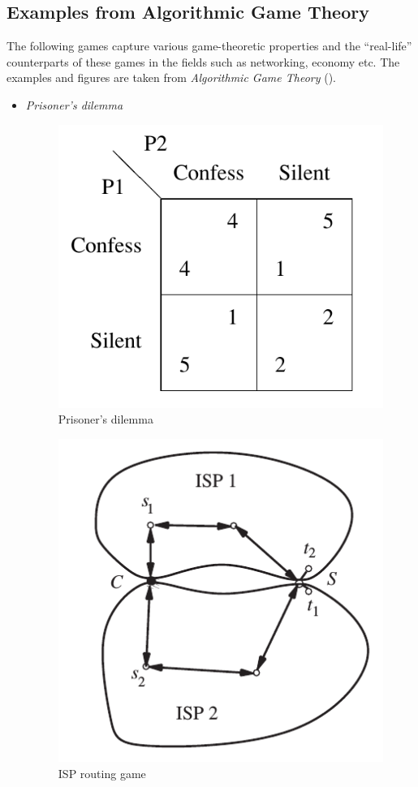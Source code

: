\subsection{Examples from Algorithmic Game Theory}

The following games capture various game-theoretic properties and the ``real-life'' counterparts of these games in the fields such as networking, economy etc.
The examples and figures are taken from \emph{Algorithmic Game Theory} (\cite{AGT07}).

\newcommand{\widthratio}{0.3}
\begin{itemize}
  \item \emph{Prisoner's dilemma} \todo
    \begin{figure}[H]
      \centering
      \includegraphics[width=\widthratio\paperwidth]{../img/prisoner.png}
      \caption{Prisoner's dilemma}
      \label{fig:prisoner}
    \end{figure}

    \begin{figure}[H]
      \centering
      \includegraphics[width=\widthratio\paperwidth]{../img/isp.png}
      \caption{ISP routing game}
      \label{fig:isp-routing}
    \end{figure}



\end{itemize}
